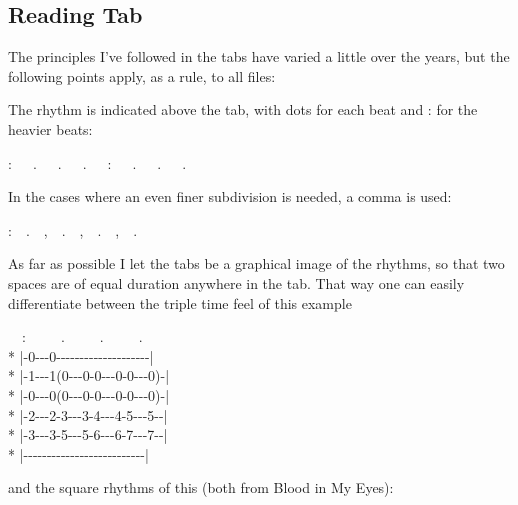 \begin{articlelayout}

\subsection*{Reading Tab}

The principles I've followed in the tabs have varied a little over the
years, but the following points apply, as a rule, to all files:

The rhythm is indicated above the tab, with dots for each beat and :
for the heavier beats:

\begin{pre}:~~~.~~~.~~~.~~~:~~~.~~~.~~~.\end{pre}

In the cases where an even finer subdivision is needed, a comma is
used:

\begin{pre}:~~.~~,~~.~~,~~.~~,~~.\end{pre}

As far as possible I let the tabs be a graphical image of the rhythms,
so that two spaces are of equal duration anywhere in the tab. That way
one can easily differentiate between the triple time feel of this
example

\begin{pre}
\begin{adjustwidth}{2em}{0em}
~~:~~~~~.~~~~~.~~~~~.\\*
|{-}0{-}{-}{-}0{-}{-}{-}{-}{-}{-}{-}{-}{-}{-}{-}{-}{-}{-}{-}{-}{-}{-}{-}{-}|\\*
|{-}1{-}{-}{-}1(0{-}{-}{-}0{-}0{-}{-}{-}0{-}0{-}{-}{-}0){-}|\\*
|{-}0{-}{-}{-}0(0{-}{-}{-}0{-}0{-}{-}{-}0{-}0{-}{-}{-}0){-}|\\*
|{-}2{-}{-}{-}2{-}3{-}{-}{-}3{-}4{-}{-}{-}4{-}5{-}{-}{-}5{-}{-}|\\*
|{-}3{-}{-}{-}3{-}5{-}{-}{-}5{-}6{-}{-}{-}6{-}7{-}{-}{-}7{-}{-}|\\*
|{-}{-}{-}{-}{-}{-}{-}{-}{-}{-}{-}{-}{-}{-}{-}{-}{-}{-}{-}{-}{-}{-}{-}{-}{-}{-}|
\end{adjustwidth}
\end{pre}

and the square rhythms of this (both from Blood in My Eyes):


\end{articlelayout}
